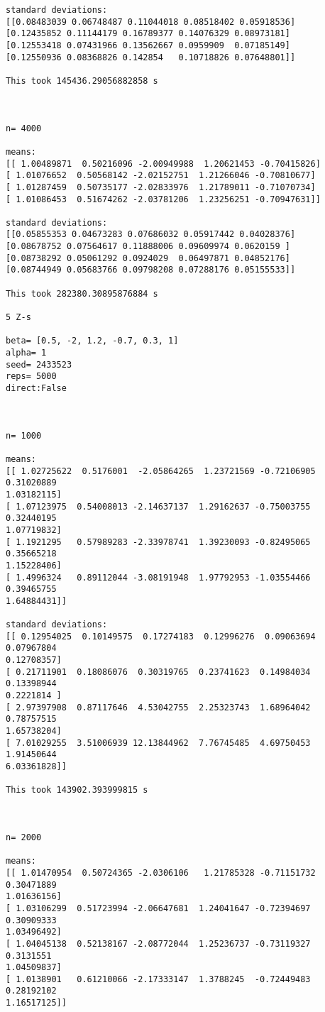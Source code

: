 \documentclass{article}
\theoremstyle{definition}
\theoremstyle{remark}
\begin{document}
\begin{verbatim}
standard deviations: 
[[0.08483039 0.06748487 0.11044018 0.08518402 0.05918536]
[0.12435852 0.11144179 0.16789377 0.14076329 0.08973181]
[0.12553418 0.07431966 0.13562667 0.0959909  0.07185149]
[0.12550936 0.08368826 0.142854   0.10718826 0.07648801]]

This took 145436.29056882858 s



n= 4000

means: 
[[ 1.00489871  0.50216096 -2.00949988  1.20621453 -0.70415826]
[ 1.01076652  0.50568142 -2.02152751  1.21266046 -0.70810677]
[ 1.01287459  0.50735177 -2.02833976  1.21789011 -0.71070734]
[ 1.01086453  0.51674262 -2.03781206  1.23256251 -0.70947631]]

standard deviations: 
[[0.05855353 0.04673283 0.07686032 0.05917442 0.04028376]
[0.08678752 0.07564617 0.11888006 0.09609974 0.0620159 ]
[0.08738292 0.05061292 0.0924029  0.06497871 0.04852176]
[0.08744949 0.05683766 0.09798208 0.07288176 0.05155533]]

This took 282380.30895876884 s

5 Z-s

beta= [0.5, -2, 1.2, -0.7, 0.3, 1]
alpha= 1
seed= 2433523
reps= 5000
direct:False



n= 1000

means: 
[[ 1.02725622  0.5176001  -2.05864265  1.23721569 -0.72106905  0.31020889
1.03182115]
[ 1.07123975  0.54008013 -2.14637137  1.29162637 -0.75003755  0.32440195
1.07719832]
[ 1.1921295   0.57989283 -2.33978741  1.39230093 -0.82495065  0.35665218
1.15228406]
[ 1.4996324   0.89112044 -3.08191948  1.97792953 -1.03554466  0.39465755
1.64884431]]

standard deviations: 
[[ 0.12954025  0.10149575  0.17274183  0.12996276  0.09063694  0.07967804
0.12708357]
[ 0.21711901  0.18086076  0.30319765  0.23741623  0.14984034  0.13398944
0.2221814 ]
[ 2.97397908  0.87117646  4.53042755  2.25323743  1.68964042  0.78757515
1.65738204]
[ 7.01029255  3.51006939 12.13844962  7.76745485  4.69750453  1.91450644
6.03361828]]

This took 143902.393999815 s



n= 2000

means: 
[[ 1.01470954  0.50724365 -2.0306106   1.21785328 -0.71151732  0.30471889
1.01636156]
[ 1.03106299  0.51723994 -2.06647681  1.24041647 -0.72394697  0.30909333
1.03496492]
[ 1.04045138  0.52138167 -2.08772044  1.25236737 -0.73119327  0.3131551
1.04509837]
[ 1.0138901   0.61210066 -2.17333147  1.3788245  -0.72449483  0.28192102
1.16517125]]


\end{verbatim}
\end{document}
